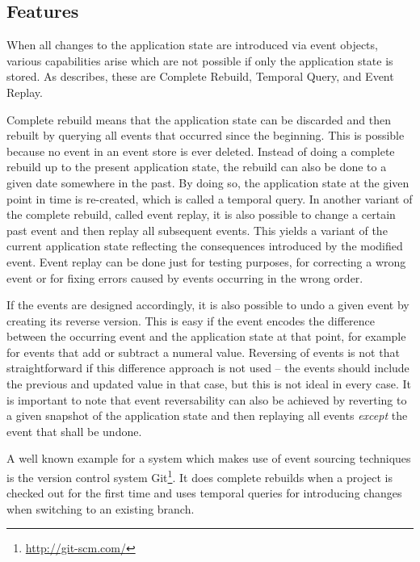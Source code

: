 \subsection{Features}

When all changes to the application state are introduced via event objects, various capabilities arise which are not possible if only the application state is stored.
As \citet{WEB:Fowler:2005} describes, these are Complete Rebuild, Temporal Query, and Event Replay.

Complete rebuild means that the application state can be discarded and then rebuilt by querying all events that occurred since the beginning.
This is possible because no event in an event store is ever deleted.
Instead of doing a complete rebuild up to the present application state, the rebuild can also be done to a given date somewhere in the past.
By doing so, the application state at the given point in time is re-created, which is called a temporal query.
In another variant of the complete rebuild, called event replay, it is also possible to change a certain past event and then replay all subsequent events.
This yields a variant of the current application state reflecting the consequences introduced by the modified event.
Event replay can be done just for testing purposes, for correcting a wrong event or for fixing errors caused by events occurring in the wrong order.

If the events are designed accordingly, it is also possible to undo a given event by creating its reverse version.
This is easy if the event encodes the difference between the occurring event and the application state at that point, for example for events that add or subtract a numeral value.
Reversing of events is not that straightforward if this difference approach is not used -- the events should include the previous and updated value in that case, but this is not ideal in every case.
It is important to note that event reversability can also be achieved by reverting to a given snapshot of the application state and then replaying all events \emph{except} the event that shall be undone.

A well known example for a system which makes use of event sourcing techniques is the version control system Git\footnote{\url{http://git-scm.com/}}.
It does complete rebuilds when a project is checked out for the first time and uses temporal queries for introducing changes when switching to an existing branch.

